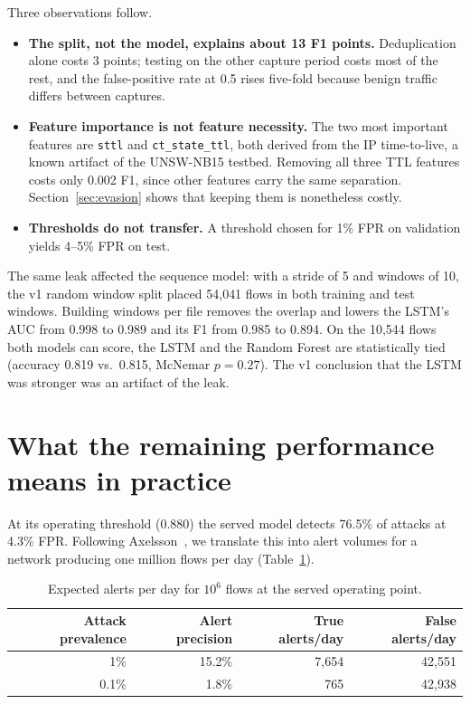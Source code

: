 \documentclass[11pt,a4paper]{article}
\newcommand{\code}[1]{\texttt{#1}}
\begin{document}
Three observations follow.
\begin{itemize}
  \item \textbf{The split, not the model, explains about 13 F1 points.}
        Deduplication alone costs 3 points; testing on the other capture
        period costs most of the rest, and the false-positive rate at 0.5
        rises five-fold because benign traffic differs between captures.
  \item \textbf{Feature importance is not feature necessity.} The two most
        important features are \code{sttl} and \code{ct\_state\_ttl}, both
        derived from the IP time-to-live, a known artifact of the UNSW-NB15
        testbed. Removing all three TTL features costs only 0.002 F1, since
        other features carry the same separation. Section~\ref{sec:evasion}
        shows that keeping them is nonetheless costly.
  \item \textbf{Thresholds do not transfer.} A threshold chosen for 1\% FPR
        on validation yields 4--5\% FPR on test.
\end{itemize}

The same leak affected the sequence model: with a stride of 5 and windows of
10, the v1 random window split placed 54,041 flows in both training and test
windows. Building windows per file removes the overlap and lowers the LSTM's
AUC from 0.998 to 0.989 and its F1 from 0.985 to 0.894. On the 10,544 flows
both models can score, the LSTM and the Random Forest are statistically tied
(accuracy 0.819 vs.\ 0.815, McNemar $p=0.27$). The v1 conclusion that the
LSTM was stronger was an artifact of the leak.

\section{What the remaining performance means in practice}
\label{sec:baserate}

At its operating threshold (0.880) the served model detects 76.5\% of
attacks at 4.3\% FPR. Following Axelsson~\cite{axelsson2000}, we translate
this into alert volumes for a network producing one million flows per day
(Table~\ref{tab:baserate}).

\begin{table}[h]
\centering
\small
\caption{Expected alerts per day for $10^6$ flows at the served operating point.}
\label{tab:baserate}
\begin{tabular}{@{}rrrr@{}}
\toprule
Attack prevalence & Alert precision & True alerts/day & False alerts/day \\
\midrule
1\%   & 15.2\% & 7,654 & 42,551 \\
0.1\% & 1.8\%  & 765   & 42,938 \\
\bottomrule
\end{tabular}
\end{table}
\end{document}
